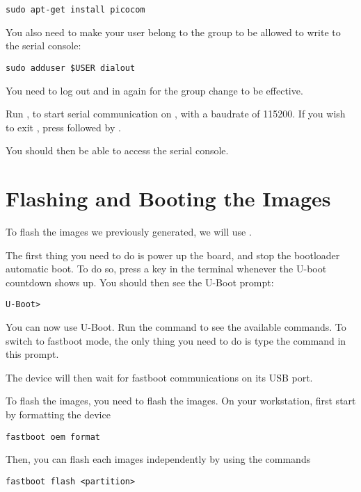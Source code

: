 \begin{verbatim}
sudo apt-get install picocom
\end{verbatim}

You also need to make your user belong to the  group to be
allowed to write to the serial console:

\begin{verbatim}
sudo adduser $USER dialout
\end{verbatim}

You need to log out and in again for the group change to be effective.

Run , to start serial
communication on , with a baudrate of 115200. If
you wish to exit , press \code{[Ctrl][a]} followed by
\code{[Ctrl][x]}.

You should then be able to access the serial console.

\section{Flashing and Booting the Images}

To flash the images we previously generated, we will use
.

The first thing you need to do is power up the board, and stop the
bootloader automatic boot. To do so, press a key in the 
terminal whenever the U-boot countdown shows up. You should then see
the U-Boot prompt:
\begin{verbatim}
U-Boot>
\end{verbatim}

You can now use U-Boot. Run the  command to see the
available commands. To switch to fastboot mode, the only thing you
need to do is type the command  in this prompt.

The device will then wait for fastboot communications on its USB port.

To flash the images, you need to flash the images. On your
workstation, first start by formatting the device

\begin{verbatim}
fastboot oem format
\end{verbatim}

Then, you can flash each images independently by using the commands

\begin{verbatim}
fastboot flash <partition>
\end{verbatim}

